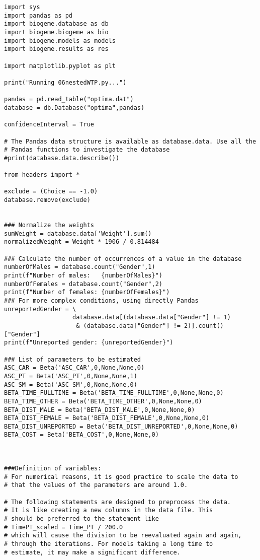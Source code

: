 \documentclass[12pt,a4paper]{article}
\begin{document}
\begin{lstlisting}[style=numbers]
import sys
import pandas as pd
import biogeme.database as db
import biogeme.biogeme as bio
import biogeme.models as models
import biogeme.results as res

import matplotlib.pyplot as plt

print("Running 06nestedWTP.py...")

pandas = pd.read_table("optima.dat")
database = db.Database("optima",pandas)

confidenceInterval = True

# The Pandas data structure is available as database.data. Use all the
# Pandas functions to investigate the database
#print(database.data.describe())

from headers import *

exclude = (Choice == -1.0)
database.remove(exclude)


### Normalize the weights
sumWeight = database.data['Weight'].sum()
normalizedWeight = Weight * 1906 / 0.814484

### Calculate the number of occurrences of a value in the database
numberOfMales = database.count("Gender",1)
print(f"Number of males:   {numberOfMales}")
numberOfFemales = database.count("Gender",2)
print(f"Number of females: {numberOfFemales}")
### For more complex conditions, using directly Pandas
unreportedGender = \
                   database.data[(database.data["Gender"] != 1)
                    & (database.data["Gender"] != 2)].count()["Gender"]
print(f"Unreported gender: {unreportedGender}")

### List of parameters to be estimated
ASC_CAR = Beta('ASC_CAR',0,None,None,0)
ASC_PT = Beta('ASC_PT',0,None,None,1)
ASC_SM = Beta('ASC_SM',0,None,None,0)
BETA_TIME_FULLTIME = Beta('BETA_TIME_FULLTIME',0,None,None,0)
BETA_TIME_OTHER = Beta('BETA_TIME_OTHER',0,None,None,0)
BETA_DIST_MALE = Beta('BETA_DIST_MALE',0,None,None,0)
BETA_DIST_FEMALE = Beta('BETA_DIST_FEMALE',0,None,None,0)
BETA_DIST_UNREPORTED = Beta('BETA_DIST_UNREPORTED',0,None,None,0)
BETA_COST = Beta('BETA_COST',0,None,None,0)



###Definition of variables:
# For numerical reasons, it is good practice to scale the data to
# that the values of the parameters are around 1.0.

# The following statements are designed to preprocess the data.
# It is like creating a new columns in the data file. This
# should be preferred to the statement like
# TimePT_scaled = Time_PT / 200.0
# which will cause the division to be reevaluated again and again,
# through the iterations. For models taking a long time to
# estimate, it may make a significant difference.


\end{lstlisting}
\end{document}
